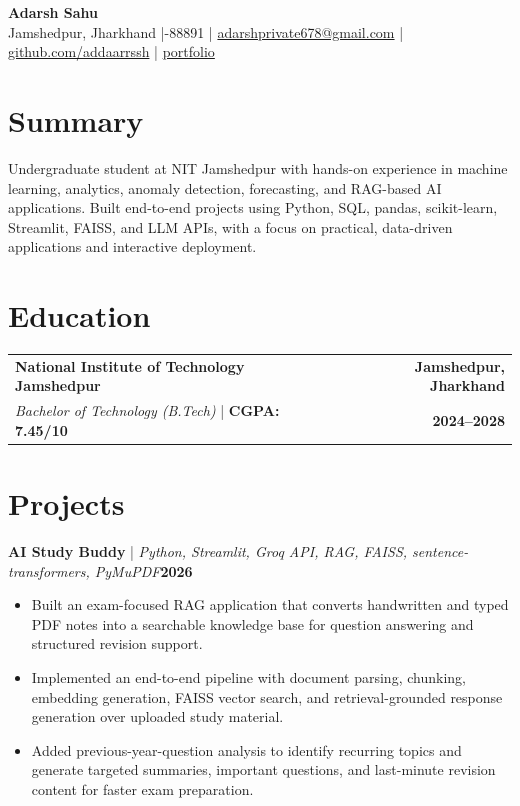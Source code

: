 \documentclass[10pt,a4paper]{article}
\newcommand{\resumeItem}[1]{\item \small{#1}}
\newcommand{\projectHeading}[3]{%
  \vspace{3pt}\noindent\textbf{#1} \;|\; \textit{\small #2}\hfill \textbf{\small #3}\par\vspace{-2pt}
}
\begin{document}
\begin{center}
  {\LARGE\bfseries\color{primary} Adarsh Sahu}\\[3pt]
  \small Jamshedpur, Jharkhand \;|-88891 \;|\;
  \href{mailto:adarshprivate678@gmail.com}{\color{accent}adarshprivate678@gmail.com} \;|\;
  \href{https://github.com/addaarrssh}{\color{accent}github.com/addaarrssh} \;|\;
  \href{https://addaarrssh.vercel.app/}{\color{accent}portfolio}
\end{center}

\section{Summary}
\small Undergraduate student at NIT Jamshedpur with hands-on experience in machine learning, analytics, anomaly detection, forecasting, and RAG-based AI applications. Built end-to-end projects using Python, SQL, pandas, scikit-learn, Streamlit, FAISS, and LLM APIs, with a focus on practical, data-driven applications and interactive deployment.

\section{Education}
\begin{tabularx}{\textwidth}{@{}X r@{}}
  \textbf{National Institute of Technology Jamshedpur} & \textbf{Jamshedpur, Jharkhand} \\
  \textit{Bachelor of Technology (B.Tech)} \;|\; \textbf{CGPA: 7.45/10} & \textbf{2024--2028}
\end{tabularx}

\section{Projects}

\projectHeading{AI Study Buddy}{Python, Streamlit, Groq API, RAG, FAISS, sentence-transformers, PyMuPDF}{2026}
\begin{itemize}
  \resumeItem{Built an exam-focused RAG application that converts handwritten and typed PDF notes into a searchable knowledge base for question answering and structured revision support.}
  \resumeItem{Implemented an end-to-end pipeline with document parsing, chunking, embedding generation, FAISS vector search, and retrieval-grounded response generation over uploaded study material.}
  \resumeItem{Added previous-year-question analysis to identify recurring topics and generate targeted summaries, important questions, and last-minute revision content for faster exam preparation.}
\end{itemize}
\end{document}
